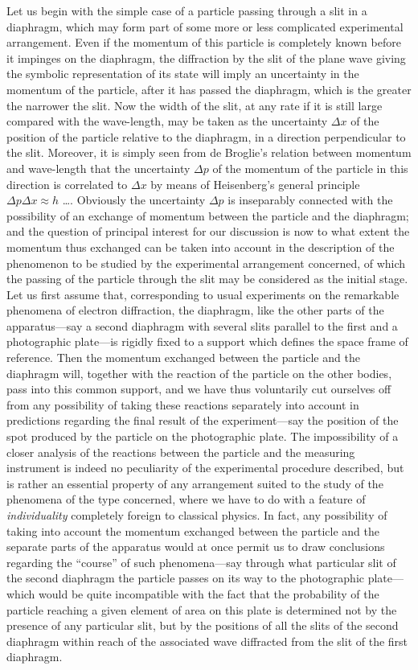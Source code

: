 \documentclass[11pt]{memoir}
\begin{document}
Let us begin with the simple case of a particle passing through a slit
in a diaphragm, which may form part of some more or less complicated
experimental arrangement. Even if the momentum of this particle is
completely known before it impinges on the diaphragm, the diffraction by
the slit of the plane wave giving the symbolic representation of its
state will imply an uncertainty in the momentum of the particle, after
it has passed the diaphragm, which is the greater the narrower the slit.
Now the width of the slit, at any rate if it is still large compared
with the wave-length, may be taken as the uncertainty $\Delta x$ of the
position of the particle relative to the diaphragm, in a direction
perpendicular to the slit. Moreover, it is simply seen from de Broglie's
relation between momentum and wave-length that the uncertainty $\Delta p$
of the momentum of the particle in this direction is correlated to
$\Delta x$ by means of Heisenberg's general principle $\Delta p\Delta x \approx h$
\ldots. Obviously the uncertainty $\Delta p$ is inseparably
connected with the possibility of an exchange of momentum between the
particle and the diaphragm; and the question of principal interest for
our discussion is now to what extent the momentum thus exchanged can be
taken into account in the description of the phenomenon to be studied by
the experimental arrangement concerned, of which the passing of the
particle through the slit may be considered as the initial stage. Let us
first assume that, corresponding to usual experiments on the remarkable
phenomena of electron diffraction, the diaphragm, like the other parts
of the apparatus---say a second diaphragm with several slits parallel to
the first and a photographic plate---is rigidly fixed to a support which
defines the space frame of reference. Then the momentum exchanged
between the particle and the diaphragm will, together with the reaction
of the particle on the other bodies, pass into this common support, and
we have thus voluntarily cut ourselves off from any possibility of
taking these reactions separately into account in predictions regarding
the final result of the experiment---say the position of the spot
produced by the particle on the photographic plate. The impossibility of
a closer analysis of the reactions between the particle and the
measuring instrument is indeed no peculiarity of the experimental
procedure described, but is rather an essential property of any
arrangement suited to the study of the phenomena of the type concerned,
where we have to do with a feature of \emph{individuality} completely
foreign to classical physics. In fact, any possibility of taking into
account the momentum exchanged between the particle and the separate
parts of the apparatus would at once permit us to draw conclusions
regarding the ``course'' of such phenomena---say through what particular
slit of the second diaphragm the particle passes on its way to the
photographic plate---which would be quite incompatible with the fact
that the probability of the particle reaching a given element of area on
this plate is determined not by the presence of any particular slit, but
by the positions of all the slits of the second diaphragm within reach
of the associated wave diffracted from the slit of the first diaphragm.
\end{document}
